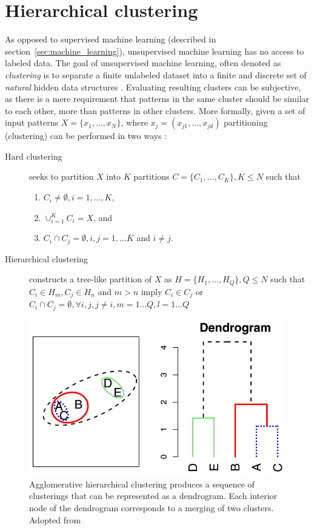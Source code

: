 \section{Hierarchical clustering}
\label{sec:hierarhical_clustering}

As opposed to supervised machine learning (described in
section~\ref{sec:machine_learning}), unsupervised machine learning
has no access to labeled data. The goal of unsupervised machine learning,
often denoted as \textit{clustering} is to separate 
a finite unlabeled dataset into a finite and discrete set of 
\textit{natural} hidden data structures \citep{xu2005survey}.
Evaluating resulting clusters can be subjective, as there is a mere 
requirement that patterns in the same cluster should be similar to each
other, more than patterns in other clusters. More formally, 
given a set of input patterns $X = \{x_1, \dots, x_N\}$, where
$x_j = (x_{j1}, \dots, x_{jd})$ partitioning (clustering) can 
be performed in two ways \citep{xu2005survey}:
\begin{description}
\item[Hard clustering] seeks to partition $X$ into $K$ partitions $C=\{C_1, \dots, C_K\}, K \leq N$
	such that 
	\begin{enumerate}
	\item $C_i \neq \emptyset, i = 1, \dots, K$, 
	\item $\cup_{i=1}^{K} C_i = X$, and
	\item $C_i \cap C_j = \emptyset , i, j = 1, \dots K$ and $i \neq j$.
	\end{enumerate}
\item[Hierarchical clustering] constructs a tree-like partition of $X$ as 
	$H = \{H_1, \dots, H_Q\}, Q \leq N$ such that
	$C_i \in H_m, C_j \in H_n$ and $m > n$
	imply $C_i \in C_j$ or $C_i \cap C_j = \emptyset, \forall i, j, j \neq
		i, m = 1 \dots Q, l = 1 \dots Q$
\end{description}

\begin{figure}
	\includegraphics{clustering_linkage.jpg}
	\caption{
		Agglomerative hierarchical clustering produces a sequence of
		clusterings that can be represented as a dendrogram. Each
		interior node of the dendrogram corresponds to a merging of two
		clusters. Adopted from \citep{bien2011hierarchical}
	}

	\label{fig:clustering}
\end{figure}

